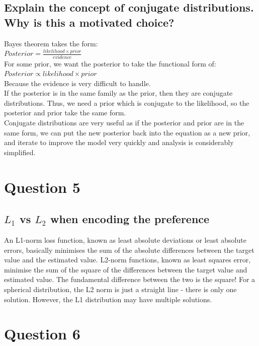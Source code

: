\documentclass[a4paper, 9pt]{article}
\begin{document}
\subsection*{Explain the concept of conjugate distributions. Why is this a motivated choice?}
Bayes theorem takes the form: \\
\newline
\( Posterior = \frac{likelihood \times prior}{evidence} \) \\
\newline
For some prior, we want the posterior to take the functional form of: \\
\newline
\( Posterior \propto likelihood \times prior \) \\
\newline
Because the evidence is very difficult to handle. \\
\newline
If the posterior is in the same family as the prior, then they are conjugate distributions. Thus, we need a prior which is conjugate to the likelihood, so the posterior and prior take the same form. \\
Conjugate distributions are very useful as if the posterior and prior are in the same form, we can put the new posterior back into the equation as a new prior, and iterate to improve the model very quickly and analysis is considerably simplified.

\section*{Question 5}
\subsection*{\( L_{1} \) vs \( L_{2} \) when encoding the preference}
An L1-norm loss function, known as least absolute deviations or least absolute errors, basically minimises the sum of the absolute differences between the target value and the estimated value. L2-norm functions, known as least squares error, minimise the sum of the square of the differences between the target value and estimated value. The fundamental difference between the two is the square!
For a spherical distribution, the L2 norm is just a straight line - there is only one solution. However, the L1 distribution may have multiple solutions.

\section*{Question 6}
\end{document}
